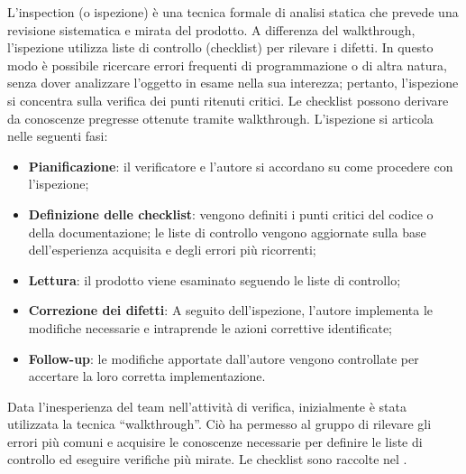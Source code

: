 \par L'inspection (o ispezione) è una tecnica formale di analisi statica che prevede una revisione sistematica e mirata del prodotto. A differenza del walkthrough, l’ispezione utilizza liste di controllo (checklist) per rilevare i difetti. In questo modo è possibile ricercare errori frequenti di programmazione o di altra natura, senza dover analizzare l’oggetto in esame nella sua interezza; pertanto, l’ispezione si concentra sulla verifica dei punti ritenuti critici. Le checklist possono derivare da conoscenze pregresse ottenute tramite walkthrough. L'ispezione si articola nelle seguenti fasi:
\begin{itemize}
  \item \textbf{Pianificazione}: il verificatore e l'autore si accordano su come procedere con l'ispezione;
  \item \textbf{Definizione delle checklist}: vengono definiti i punti critici del codice o della documentazione; le liste di controllo vengono aggiornate sulla base dell’esperienza acquisita e degli errori più ricorrenti;
  \item \textbf{Lettura}: il prodotto viene esaminato seguendo le liste di controllo;
  \item \textbf{Correzione dei difetti}: A seguito dell'ispezione, l'autore implementa le modifiche necessarie e intraprende le azioni correttive identificate;
  \item \textbf{Follow-up}: le modifiche apportate dall'autore vengono controllate per accertare la loro corretta implementazione.
\end{itemize}

\vspace{0.5\baselineskip}
\par Data l’inesperienza del team nell'attività di verifica, inizialmente è stata utilizzata la tecnica “walkthrough”. Ciò ha permesso al gruppo di rilevare gli errori più comuni e acquisire le conoscenze necessarie per definire le liste di controllo ed eseguire verifiche più mirate. Le checklist sono raccolte nel \PianoDiQualifica.

